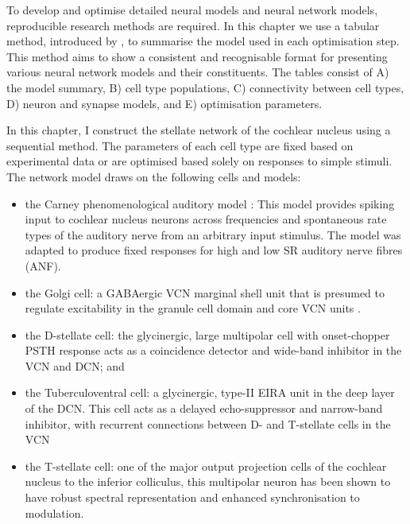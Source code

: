   To develop and optimise detailed neural models and
neural network models, reproducible research methods are required. In
this chapter we use a tabular method, introduced by
\citet{NordlieGewaltigEtAl:2009}, to summarise the model used in each
optimisation step. This method aims to show a consistent and
recognisable format for presenting various neural network models and
their constituents.  The tables consist of A) the model summary, B)
cell type populations, C) connectivity between cell types, D) neuron
and synapse models, and E) optimisation parameters.

\medskip{}

In this chapter, I construct the stellate network of the cochlear
nucleus using a sequential method.  The parameters of each cell type
are fixed based on experimental data or are optimised based solely on
responses to simple stimuli. The network model draws on the following
cells and models:
\begin{itemize}
\item the Carney phenomenological auditory model
  \citet{ZilanyBruceEtAl:2009}: This model provides spiking input to
  cochlear nucleus neurons across frequencies and spontaneous rate
  types of the auditory nerve from an arbitrary input stimulus.  The
  model was adapted to produce fixed responses for high and low SR
  auditory nerve fibres (ANF).
\item the Golgi cell: a GABAergic VCN marginal shell unit that is
  presumed to regulate excitability in the granule cell domain and
  core VCN units \citep{FerragamoGoldingEtAl:1998}.
\item the D-stellate cell: the glycinergic, large multipolar cell with
  onset-chopper PSTH response acts as a co\-incidence detector and
  wide-band inhibitor in the VCN and DCN; and
\item the Tuberculo\-ventral cell: a glycinergic, type-II EIRA unit in
  the deep layer of the DCN.  This cell acts as a delayed
  echo-suppressor and narrow-band inhibitor, with recurrent
  connections between D- and T-stellate cells in the VCN
\item the T-stellate cell: one of the major output projection cells of
  the cochlear nucleus to the inferior colliculus, this multipolar
  neuron has been shown to have robust spectral representation and
  enhanced synchronisation to modulation.
\end{itemize}

